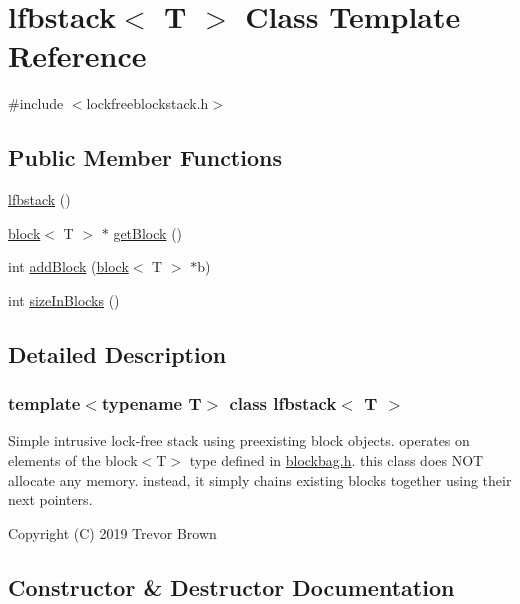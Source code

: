 \hypertarget{classlfbstack}{}\section{lfbstack$<$ T $>$ Class Template Reference}
\label{classlfbstack}


{\ttfamily \#include $<$lockfreeblockstack.\+h$>$}

\subsection*{Public Member Functions}
\begin{DoxyCompactItemize}
\item 
\hyperlink{classlfbstack_a214f01ec25e7729dd88bcfd4e96fb575}{lfbstack} ()
\item 
\hyperlink{classblock}{block}$<$ T $>$ $\ast$ \hyperlink{classlfbstack_a8b78f1dc42e697c2f792cc31be0b532a}{get\+Block} ()
\item 
int \hyperlink{classlfbstack_a82d5afa49bef74cb2cc06a5a8a6e10c8}{add\+Block} (\hyperlink{classblock}{block}$<$ T $>$ $\ast$b)
\item 
int \hyperlink{classlfbstack_ab602d933c91551c9d52b768a43381cab}{size\+In\+Blocks} ()
\end{DoxyCompactItemize}


\subsection{Detailed Description}
\subsubsection*{template$<$typename T$>$\newline
class lfbstack$<$ T $>$}

Simple intrusive lock-\/free stack using preexisting block objects. operates on elements of the block$<$\+T$>$ type defined in \hyperlink{blockbag_8h}{blockbag.\+h}. this class does N\+OT allocate any memory. instead, it simply chains existing blocks together using their next pointers.

Copyright (C) 2019 Trevor Brown 

\subsection{Constructor \& Destructor Documentation}
\mbox{\label{classlfbstack_a214f01ec25e7729dd88bcfd4e96fb575}} 
